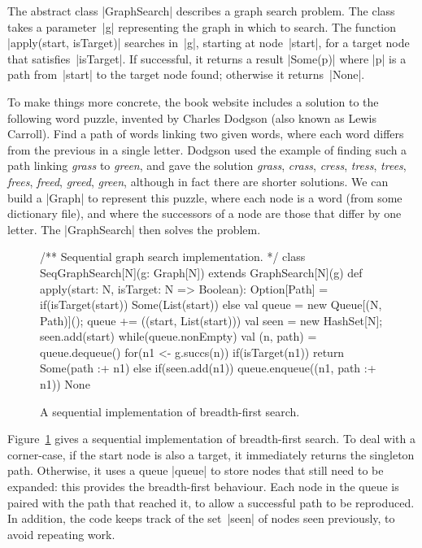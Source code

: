 
The abstract class |GraphSearch| describes a graph search problem.  The class
takes a parameter~|g| representing the graph in which to search.  The function
|apply(start, isTarget)| searches in~|g|, starting at node~|start|, for a
target node that satisfies~|isTarget|.  If successful, it returns a result
|Some(p)| where |p| is a path from~|start| to the target node found; otherwise
it returns~|None|. 

\def\word#1{\emph{#1}}

To make things more concrete, the book website includes a solution to the
following word puzzle, invented by Charles Dodgson (also known as Lewis
Carroll).  Find a path of words linking two given words, where each word
differs from the previous in a single letter.  Dodgson used the example of
finding such a path linking \word{grass} to \word{green}, and gave the
solution \word{grass}, \word{crass}, \word{cress}, \word{tress}, \word{trees},
\word{frees}, \word{freed}, \word{greed}, \word{green}, although in fact there
are shorter solutions.  We can build a |Graph| to represent this puzzle, where
each node is a word (from some dictionary file), and where the successors of a
node are those that differ by one letter.  The |GraphSearch| then solves the
problem.


\begin{figure}
\begin{scala}
/** Sequential graph search implementation. */
class SeqGraphSearch[N](g: Graph[N]) extends GraphSearch[N](g){
  def apply(start: N, isTarget: N => Boolean): Option[Path] = {
    if(isTarget(start)) Some(List(start))
    else{
      val queue = new Queue[(N, Path)](); queue += ((start, List(start)))
      val seen = new HashSet[N]; seen.add(start)
      while(queue.nonEmpty){
        val (n, path) = queue.dequeue()
        for(n1 <- g.succs(n)){
          if(isTarget(n1)) return Some(path :+ n1)
          else if(seen.add(n1)) queue.enqueue((n1, path :+ n1))
        }
      }
      None
    }
  }
}
\end{scala}
\caption{A sequential implementation of breadth-first search.}
\label{fig:bfs-seq}
\end{figure}


Figure~\ref{fig:bfs-seq} gives a sequential implementation of breadth-first
search.  To deal with a corner-case, if the start node is also a target, it
immediately returns the singleton path.  Otherwise, it uses a queue |queue| to
store nodes that still need to be expanded: this provides the breadth-first
behaviour.  Each node in the queue is paired with the path that reached it, to
allow a successful path to be reproduced.  In addition, the code keeps track
of the set~|seen| of nodes seen previously, to avoid repeating work.

